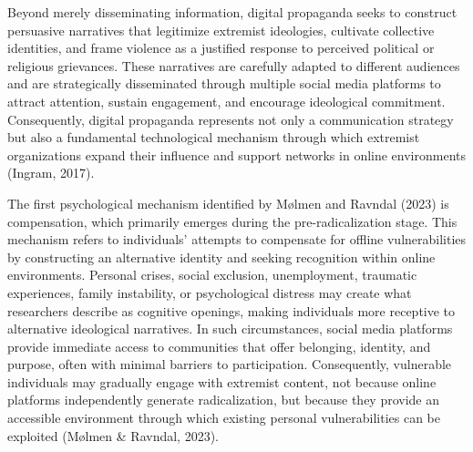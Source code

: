 \documentclass[10pt]{NSP1}
\begin{document}
Beyond merely disseminating information, digital propaganda seeks to construct persuasive narratives that legitimize extremist ideologies, cultivate collective identities, and frame violence as a justified response to perceived political or religious grievances. These narratives are carefully adapted to different audiences and are strategically disseminated through multiple social media platforms to attract attention, sustain engagement, and encourage ideological commitment. Consequently, digital propaganda represents not only a communication strategy but also a fundamental technological mechanism through which extremist organizations expand their influence and support networks in online environments (Ingram, 2017).

\par\medskip{}\smallskip

\par\medskip{}\smallskip

The first psychological mechanism identified by Mølmen and Ravndal (2023) is compensation, which primarily emerges during the pre-radicalization stage. This mechanism refers to individuals' attempts to compensate for offline vulnerabilities by constructing an alternative identity and seeking recognition within online environments. Personal crises, social exclusion, unemployment, traumatic experiences, family instability, or psychological distress may create what researchers describe as cognitive openings, making individuals more receptive to alternative ideological narratives. In such circumstances, social media platforms provide immediate access to communities that offer belonging, identity, and purpose, often with minimal barriers to participation. Consequently, vulnerable individuals may gradually engage with extremist content, not because online platforms independently generate radicalization, but because they provide an accessible environment through which existing personal vulnerabilities can be exploited (Mølmen \& Ravndal, 2023).

\par\medskip{}\smallskip
\end{document}
